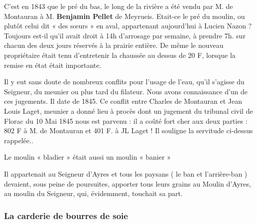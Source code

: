 \vspace{0.35cm}

C’est en 1843 que le pré du bas, le long de la rivière a été vendu par M. de Montauran à M.
\textbf{Benjamin Pellet} de Meyrueis. Etait-ce le pré du moulin, ou plutôt celui dit « des sœurs » en
aval, appartenant aujourd’hui à Lucien Nazon ? Toujours est-il qu’il avait droit à 14h
d’arrosage par semaine, à prendre 7h. sur chacun des deux jours réservés à la prairie entière.
De même le nouveau propriétaire était tenu d’entretenir la chaussée au dessus de 20 F, lorsque
la remise en état était importante.

\vspace{0.35cm}

Il y eut sans doute de nombreux conflits pour l’usage de l’eau, qu’il s’agisse du Seigneur, du
meunier ou plus tard du filateur. Nous avons connaissance d’un de ces jugements. Il date de
1845. Ce conflit entre Charles de Montauran et Jean Louis Laget, meunier a donné lieu à
procès dont un jugement du tribunal civil de Florac du 10 Mai 1845 nous est parvenu : il a
coûté fort cher aux deux parties : 802 F à M. de Montauran et 401 F. à JL Laget ! Il souligne
la servitude ci-dessus rappelée..

\vspace{0.35cm}

Le moulin « bladier » était aussi un moulin « banier »

Il appartenait au Seigneur d’Ayres et tous les paysans ( le ban et l’arrière-ban ) devaient, sous
peine de poursuites, apporter tous leurs grains au Moulin d’Ayres, au moulin du Seigneur,
qui, évidemment, touchait sa part.

\vspace{1.3cm}


\begin{center}
\end{center}

\subsubsection{La carderie de bourres de soie}


